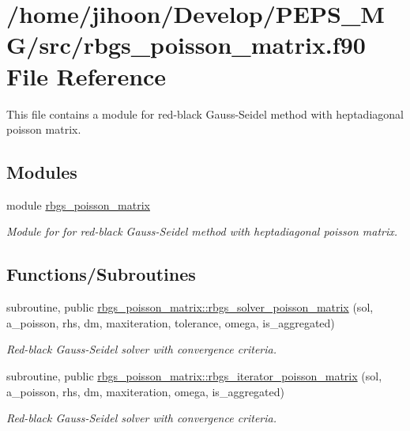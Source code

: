 \hypertarget{rbgs__poisson__matrix_8f90}{}\section{/home/jihoon/\+Develop/\+P\+E\+P\+S\+\_\+\+M\+G/src/rbgs\+\_\+poisson\+\_\+matrix.f90 File Reference}
\label{rbgs__poisson__matrix_8f90}


This file contains a module for red-\/black Gauss-\/\+Seidel method with heptadiagonal poisson matrix.  


\subsection*{Modules}
\begin{DoxyCompactItemize}
\item 
module \hyperlink{namespacerbgs__poisson__matrix}{rbgs\+\_\+poisson\+\_\+matrix}
\begin{DoxyCompactList}\small\item\em Module for for red-\/black Gauss-\/\+Seidel method with heptadiagonal poisson matrix. \end{DoxyCompactList}\end{DoxyCompactItemize}
\subsection*{Functions/\+Subroutines}
\begin{DoxyCompactItemize}
\item 
subroutine, public \hyperlink{namespacerbgs__poisson__matrix_a4706c96056deda74122016f5c07ba337}{rbgs\+\_\+poisson\+\_\+matrix\+::rbgs\+\_\+solver\+\_\+poisson\+\_\+matrix} (sol, a\+\_\+poisson, rhs, dm, maxiteration, tolerance, omega, is\+\_\+aggregated)
\begin{DoxyCompactList}\small\item\em Red-\/black Gauss-\/\+Seidel solver with convergence criteria. \end{DoxyCompactList}\item 
subroutine, public \hyperlink{namespacerbgs__poisson__matrix_a35a0647dd0b1e09cb482bde7fba2be91}{rbgs\+\_\+poisson\+\_\+matrix\+::rbgs\+\_\+iterator\+\_\+poisson\+\_\+matrix} (sol, a\+\_\+poisson, rhs, dm, maxiteration, omega, is\+\_\+aggregated)
\begin{DoxyCompactList}\small\item\em Red-\/black Gauss-\/\+Seidel solver with convergence criteria. \end{DoxyCompactList}\end{DoxyCompactItemize}


